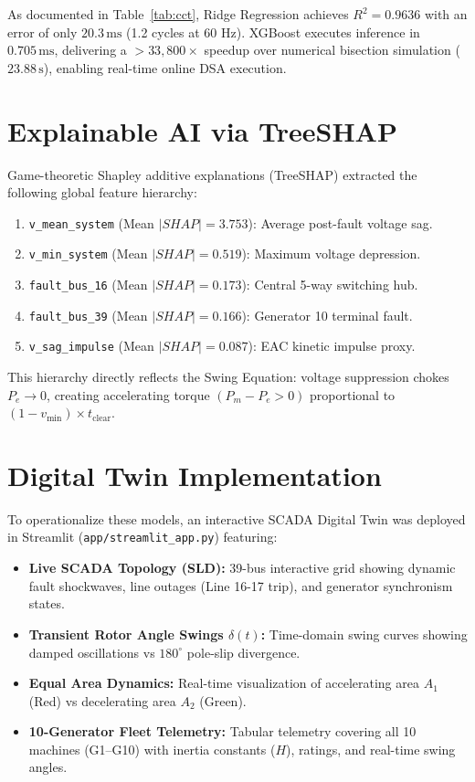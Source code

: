 \documentclass[journal]{IEEEtran}
\begin{document}
As documented in Table~\ref{tab:cct}, Ridge Regression achieves $R^2 = 0.9636$ with an error of only $20.3\,\text{ms}$ (1.2 cycles at 60 Hz). XGBoost executes inference in $0.705\,\text{ms}$, delivering a $>33,800\times$ speedup over numerical bisection simulation ($23.88\,\text{s}$), enabling real-time online DSA execution.

\section{Explainable AI via TreeSHAP}
Game-theoretic Shapley additive explanations (TreeSHAP) \cite{lundberg2017unified} extracted the following global feature hierarchy:
\begin{enumerate}
    \item \texttt{v\_mean\_system} (Mean $|SHAP| = 3.753$): Average post-fault voltage sag.
    \item \texttt{v\_min\_system} (Mean $|SHAP| = 0.519$): Maximum voltage depression.
    \item \texttt{fault\_bus\_16} (Mean $|SHAP| = 0.173$): Central 5-way switching hub.
    \item \texttt{fault\_bus\_39} (Mean $|SHAP| = 0.166$): Generator 10 terminal fault.
    \item \texttt{v\_sag\_impulse} (Mean $|SHAP| = 0.087$): EAC kinetic impulse proxy.
\end{enumerate}
This hierarchy directly reflects the Swing Equation: voltage suppression chokes $P_e \to 0$, creating accelerating torque $(P_m - P_e > 0)$ proportional to $(1 - v_{\min}) \times t_{\text{clear}}$.

\section{Digital Twin Implementation}
To operationalize these models, an interactive SCADA Digital Twin was deployed in Streamlit (\texttt{app/streamlit\_app.py}) featuring:
\begin{itemize}
    \item \textbf{Live SCADA Topology (SLD):} 39-bus interactive grid showing dynamic fault shockwaves, line outages (Line 16-17 trip), and generator synchronism states.
    \item \textbf{Transient Rotor Angle Swings $\delta(t)$:} Time-domain swing curves showing damped oscillations vs $180^\circ$ pole-slip divergence.
    \item \textbf{Equal Area Dynamics:} Real-time visualization of accelerating area $A_1$ (Red) vs decelerating area $A_2$ (Green).
    \item \textbf{10-Generator Fleet Telemetry:} Tabular telemetry covering all 10 machines (G1--G10) with inertia constants ($H$), ratings, and real-time swing angles.
\end{itemize}
\end{document}
